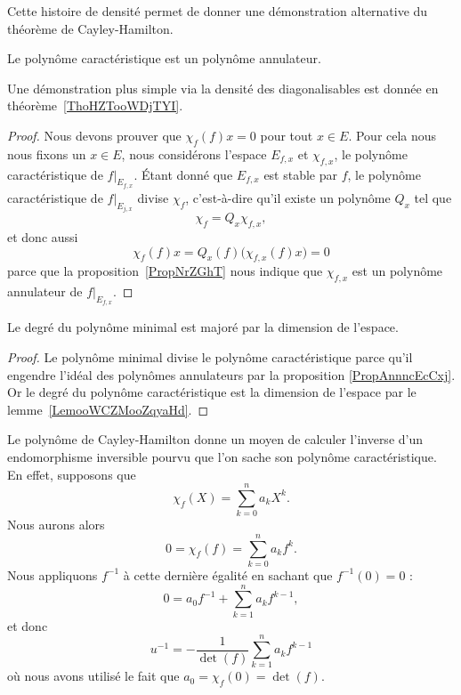 Cette histoire de densité permet de donner une démonstration alternative du théorème de Cayley-Hamilton.
\begin{theorem}   \label{ThoCalYWLbJQ}
    Le polynôme caractéristique est un polynôme annulateur.
\end{theorem}

Une démonstration plus simple via la densité des diagonalisables est donnée en théorème~\ref{ThoHZTooWDjTYI}.
\begin{proof}
    Nous devons prouver que \( \chi_f(f)x=0\) pour tout \( x\in E\). Pour cela nous nous fixons un \( x\in E\), nous considérons l'espace \( E_{f,x}\) et \( \chi_{f,x}\), le polynôme caractéristique de \( f|_{E_{f,x}}\). Étant donné que \( E_{f,x}\) est stable par \( f\), le polynôme caractéristique de \( f|_{E_{j,x}}\) divise \( \chi_f\), c'est-à-dire qu'il existe un polynôme \( Q_x\) tel que
    \begin{equation}
        \chi_f=Q_x\chi_{f,x},
    \end{equation}
    et donc aussi
    \begin{equation}
        \chi_f(f)x=Q_x(f)\big( \chi_{f,x}(f)x \big)=0
    \end{equation}
    parce que la proposition~\ref{PropNrZGhT} nous indique que \( \chi_{f,x}\) est un polynôme annulateur de \( f|_{E_{f,x}}\).
\end{proof}

\begin{corollary}
    Le degré du polynôme minimal est majoré par la dimension de l'espace.
\end{corollary}

\begin{proof}
    Le polynôme minimal divise le polynôme caractéristique parce qu'il engendre l'idéal des polynômes annulateurs par la proposition \ref{PropAnnncEcCxj}. Or le degré du polynôme caractéristique est la dimension de l'espace par le lemme~\ref{LemooWCZMooZqyaHd}.
\end{proof}

\begin{example}
    Le polynôme de Cayley-Hamilton donne un moyen de calculer l'inverse d'un endomorphisme inversible pourvu que l'on sache son polynôme caractéristique. En effet, supposons que
    \begin{equation}
        \chi_f(X)=\sum_{k=0}^na_kX^k.
    \end{equation}
    Nous aurons alors
    \begin{equation}
        0=\chi_f(f)=\sum_{k=0}^na_kf^k.
    \end{equation}
    Nous appliquons \( f^{-1}\) à cette dernière égalité en sachant que \( f^{-1}(0)=0\) :
    \begin{equation}
        0=a_0f^{-1}+\sum_{k=1}^na_kf^{k-1},
    \end{equation}
    et donc
    \begin{equation}
        u^{-1}=-\frac{1}{ \det(f) }\sum_{k=1}^na_kf^{k-1}
    \end{equation}
    où nous avons utilisé le fait que \( a_0=\chi_f(0)=\det(f)\).
\end{example}

